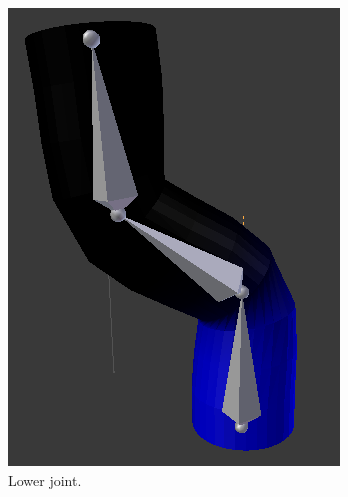         \begin{figure}[H]
            \centering
            \begin{subfigure}{0.25\linewidth}
            \centering
                \includegraphics[width=1\linewidth]{wonky_pole/lower_bone}
                \caption{Lower joint.}
            \end{subfigure}%
            \begin{subfigure}{0.25\linewidth}
            \centering

\end{subfigure}
\end{figure}
